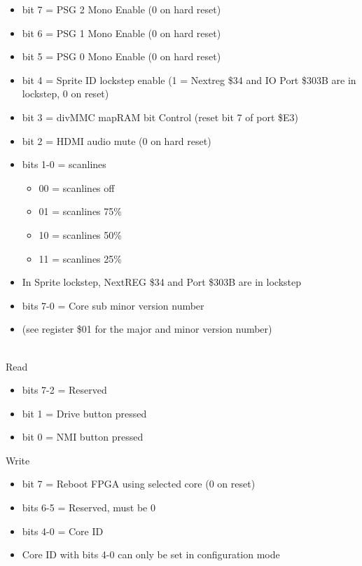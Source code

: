 \begin{itemize}
\item bit 7 = PSG 2 Mono Enable (0 on hard reset)
\item bit 6 = PSG 1 Mono Enable (0 on hard reset)
\item bit 5 = PSG 0 Mono Enable (0 on hard reset)
\item bit 4 = Sprite ID lockstep enable (1 = Nextreg \$34 and IO Port
  \$303B are in lockstep, 0 on reset)
\item bit 3 = divMMC mapRAM bit Control (reset bit 7 of port \$E3)
\item bit 2 = HDMI audio mute (0 on hard reset)
\item bits 1-0 = scanlines
  \begin{itemize}
  \item 00 = scanlines off
  \item 01 = scanlines 75\%
  \item 10 = scanlines 50\%
  \item 11 = scanlines 25\%
  \end{itemize}
\item[] In Sprite lockstep, NextREG \$34 and Port \$303B are in
  lockstep
\end{itemize}

\begin{itemize}
\item bits 7-0 = Core sub minor version number
\item[] (see register \$01 for the major and minor version number)
\end{itemize}

\\
Read
\begin{itemize}
\item bits 7-2 = Reserved
\item bit 1 = Drive button pressed
\item bit 0 = NMI button pressed
\end{itemize}
Write
\begin{itemize}
\item bit 7 = Reboot FPGA using selected core (0 on reset)
\item bits 6-5 = Reserved, must be 0
\item bits 4-0 = Core ID
\item[] Core ID with bits 4-0 can only be set in configuration mode
\end{itemize}

